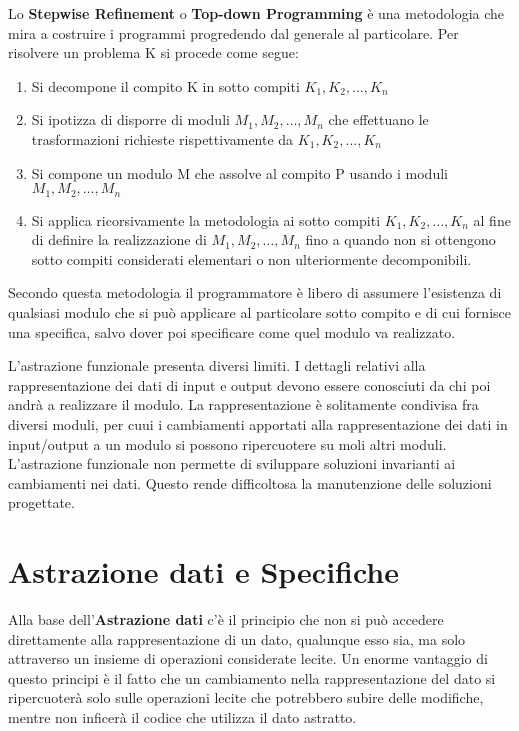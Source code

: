 \documentclass[a4paper,18pt]{extarticle}
\begin{document}
Lo \textbf{Stepwise Refinement} o \textbf{Top-down Programming} è una metodologia che mira a costruire i programmi progredendo dal generale al particolare. Per risolvere un problema K si procede come segue:
\begin{enumerate}
    \item Si decompone il compito K in sotto compiti $K_1, K_2, \dots, K_n$
    \item Si ipotizza di disporre di moduli $M_1, M_2, \dots, M_n$ che effettuano le trasformazioni richieste rispettivamente da $K_1, K_2, \dots, K_n$
    \item Si compone un modulo M che assolve al compito P usando i moduli $M_1, M_2, \dots, M_n$
    \item Si applica ricorsivamente la metodologia ai sotto compiti $K_1, K_2, \dots, K_n$ al fine di definire la realizzazione di $M_1, M_2, \dots, M_n$ fino a quando non si ottengono sotto compiti considerati elementari o non ulteriormente decomponibili.
\end{enumerate}

Secondo questa metodologia il programmatore è libero di assumere l'esistenza di qualsiasi modulo che si può applicare al particolare sotto compito e di cui fornisce una specifica, salvo dover poi specificare come quel modulo va realizzato.

L'astrazione funzionale presenta diversi limiti. I dettagli relativi alla rappresentazione dei dati di input e output devono essere conosciuti da chi poi andrà a realizzare il modulo. La rappresentazione è solitamente condivisa fra diversi moduli, per cuui i cambiamenti apportati alla rappresentazione dei dati in input/output a un modulo si possono ripercuotere su moli altri moduli. L'astrazione funzionale non permette di sviluppare soluzioni invarianti ai cambiamenti nei dati. Questo rende difficoltosa la manutenzione delle soluzioni progettate.

\newpage

\section{ Astrazione dati e Specifiche}

Alla base dell'\textbf{Astrazione dati} c'è il principio che non si può accedere direttamente alla rappresentazione di un dato, qualunque esso sia, ma solo attraverso un insieme di operazioni considerate lecite. Un enorme vantaggio di questo principi è il fatto che un cambiamento nella rappresentazione del dato si ripercuoterà solo sulle operazioni lecite che potrebbero subire delle modifiche, mentre non inficerà il codice che utilizza il dato astratto.
\end{document}
